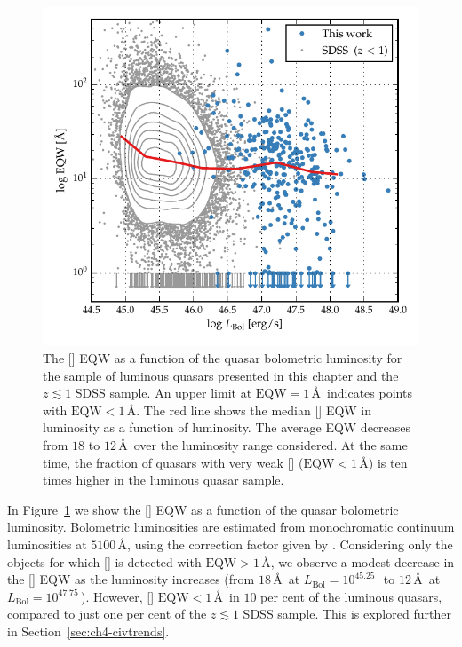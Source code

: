 \begin{figure}[t!]
\centering 
    \includegraphics[width=\columnwidth]{figures/chapter04/eqw_lum.pdf} 
    \caption[{The [] EQW as a function of the quasar bolometric luminosity.}]{The [] EQW as a function of the quasar bolometric luminosity for the sample of luminous quasars presented in this chapter and the $z\lesssim1$ SDSS sample. An upper limit at $\text{EQW}=1$\,\AA\, indicates points with $\text{EQW} < 1$\,\AA. The red line shows the median [] EQW in luminosity as a function of luminosity. The average EQW decreases from $18$ to $12$\,\AA\, over the luminosity range considered. At the same time, the fraction of quasars with very weak [] ($\text{EQW} < 1$\,\AA) is ten times higher in the luminous quasar sample.}     
    \label{fig:eqw_lum}
\end{figure}

In Figure~\ref{fig:eqw_lum} we show the [] EQW as a function of the quasar bolometric luminosity. 
Bolometric luminosities are estimated from monochromatic continuum luminosities at $5100$\,\AA, using the correction factor given by \citet{richards06}. 
Considering only the objects for which [] is detected with $\text{EQW} > 1$\,\AA, we observe a modest decrease in the [] EQW as the luminosity increases (from $18$\,\AA\, at $L_{\text{Bol}}=10^{45.25}$\,\ergs\, to $12$\,\AA\, at $L_{\text{Bol}}=10^{47.75}$\,\ergs). 
However, [] $\text{EQW} < 1$\,\AA\, in $10$ per cent of the luminous quasars, compared to just one per cent of the $z \lesssim 1$ SDSS sample.
This is explored further in Section~\ref{sec:ch4-civtrends}.  

